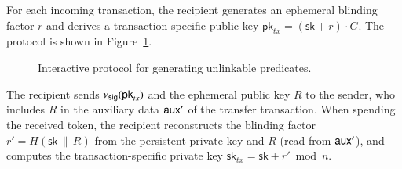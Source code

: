 For each incoming transaction, the recipient generates an ephemeral blinding factor $r$ and derives a transaction-specific public key $\mathsf{pk}_{tx} = (\mathsf{sk} + r) \cdot G$. The protocol is shown in Figure~\ref{fig:private-interactive}.

\begin{figure}[!htb]
\centering
{}
\caption{Interactive protocol for generating unlinkable predicates.}
\label{fig:private-interactive}
\end{figure}

The recipient sends $\nu_\mathsf{sig}(\mathsf{pk}_{tx})$ and the ephemeral public key $R$ to the sender, who includes $R$ in the auxiliary data $\mathsf{aux}'$ of the transfer transaction. When spending the received token, the recipient reconstructs the blinding factor $r' = H(\mathsf{sk} \,\|\, R)$ from the persistent private key and $R$ (read from $\mathsf{aux}'$), and computes the transaction-specific private key $\mathsf{sk}_{tx} = \mathsf{sk} + r' \bmod n$.

